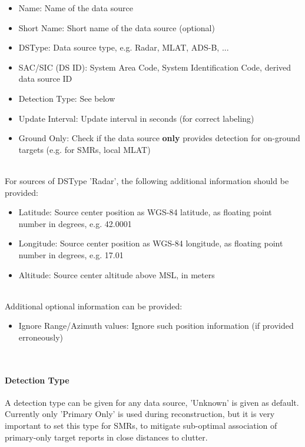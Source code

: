 \begin{itemize}
\item Name: Name of the data source
\item Short Name: Short name of the data source (optional)
\item DSType: Data source type, e.g. Radar, MLAT, ADS-B, ...
\item SAC/SIC (DS ID): System Area Code, System Identification Code, derived data source ID
\item Detection Type: See below
\item Update Interval: Update interval in seconds (for correct labeling)
\item Ground Only: Check if the data source \textbf{only} provides detection for on-ground targets (e.g. for SMRs, local MLAT)
\end{itemize}
\ \\

For sources of DSType 'Radar', the following additional information should be provided:

\begin{itemize}
\item Latitude: Source center position as WGS-84 latitude, as floating point number in degrees, e.g. 42.0001
\item Longitude: Source center position as WGS-84 longitude, as floating point number in degrees, e.g. 17.01
\item Altitude: Source center altitude above MSL, in meters
\end{itemize}
\ \\

Additional optional information can be provided:

\begin{itemize}
\item Ignore Range/Azimuth values: Ignore such position information (if provided erroneously)
\end{itemize}
\ \\

\paragraph{Detection Type}

A detection type can be given for any data source, 'Unknown' is given as default. Currently only 'Primary Only' is used during reconstruction, but it is very important to set this type for SMRs, to mitigate sub-optimal association of primary-only target reports in close distances to clutter. \\


